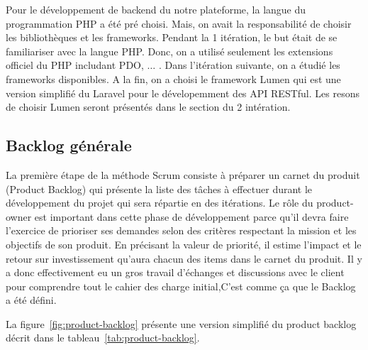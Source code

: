 Pour le développement de backend du notre plateforme, la langue du programmation
PHP a été pré choisi. Mais, on avait la responsabilité de choisir les
bibliothèques et les frameworks. Pendant la 1\iere{} itération, le but était de
se familiariser avec la langue PHP. Donc, on a utilisé seulement les extensions
officiel du PHP includant PDO, $\dotsc$ . Dans l'itération suivante, on a étudié
les frameworks disponibles. A la fin, on a choisi le framework Lumen qui est
une version simplifié du Laravel pour le dévelopemment des API RESTful. Les
resons de choisir Lumen seront présentés dans le section du 2\ieme{} intération.

\subsection{Backlog générale}
La première étape de la méthode Scrum consiste à préparer un carnet du produit
(Product Backlog) qui présente la liste des tâches à effectuer durant le développement
du projet qui sera répartie en des itérations. Le rôle du product-owner est important
dans cette phase de développement parce qu’il devra faire l’exercice de prioriser ses
demandes selon des critères respectant la mission et les objectifs de son produit. En
précisant la valeur de priorité, il estime l’impact et le retour sur investissement 
qu’aura chacun des items dans le carnet du produit.
Il y a donc effectivement eu un gros travail
d’échanges et discussions avec le client pour comprendre tout le cahier des charge
initial,C’est comme ça que le Backlog a été défini.

La figure~\ref{fig:product-backlog} présente une version simplifié du product
backlog décrit dans le tableau~\ref{tab:product-backlog}.


